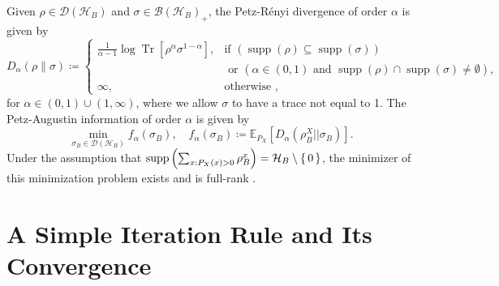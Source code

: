 \documentclass{article}
\DeclareMathOperator{\supp}{supp}
\begin{document}
Given \(\rho \in \mathcal{D}(\mathcal{H}_B)\) and \(\sigma \in \mathcal{B}\left(\mathcal{H}_B\right)_{+}\), the Petz-R\'{e}nyi divergence of order \(\alpha\) is given by \cite{Petz1986}  
\[
D_{\alpha}(\rho \| \sigma) \coloneqq  
\begin{cases}  
\frac{1}{\alpha - 1} \log \operatorname{Tr}\left[\rho^{\alpha} \sigma^{1-\alpha}\right], & \text{if } \left(\supp(\rho) \subseteq \supp(\sigma)\right)\\
&\text{ or }\left(\alpha\in(0,1)
\text{ and }\supp(\rho)\cap\supp(\sigma)\neq \emptyset\right), \\  
\infty, &\text{otherwise },%
\end{cases}   
\]
for \(\alpha \in (0, 1) \cup (1, \infty)\), where we allow \(\sigma\) to have a trace not equal to 1.
The Petz-Augustin information of order $\alpha$ 
is given by 
\begin{equation} \label{eq:Petz_Augustin}
    \min_{\sigma_B \in \mathcal{D}(\mathcal{H}_B)} f_{\alpha}(\sigma_B), \quad f_{\alpha} ( \sigma_B ) \coloneqq \mathbb{E}_{P_{X}}\left[{D_{\alpha}\left(\rho_B^{X} \vert\vert\sigma_B\right)}\right].
\end{equation}
Under the assumption that $\supp\left(\sum_{x:P_X(x)>0}\rho_B^x\right) = \mathcal{H}_B\setminus\set{0}$, the minimizer of this minimization problem exists \cite[Lemma IV.8]{Mosonyi2021} and is 
full-rank \cite[Lemma IV.11]{Mosonyi2021}.








\section{A Simple Iteration Rule and Its Convergence}
\label{sec:alg}
\end{document}
